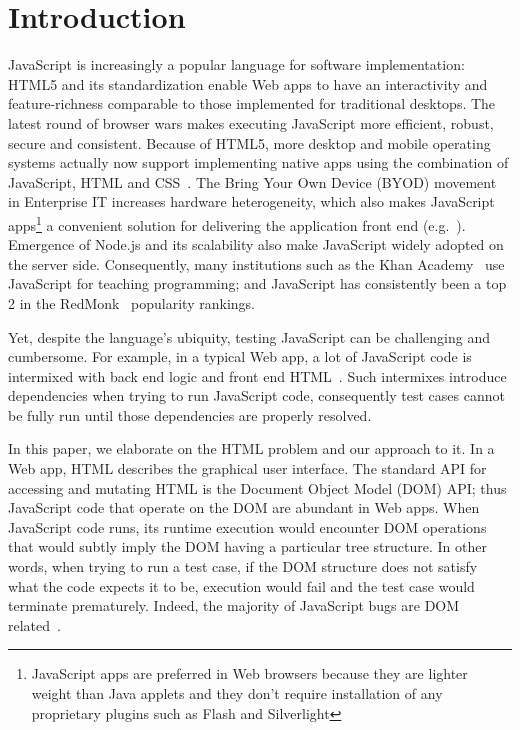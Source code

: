 \section{Introduction}
JavaScript is increasingly a popular language for software implementation: %
HTML5 and its standardization enable Web apps to have an interactivity and feature-richness comparable to those implemented for traditional desktops.  
The latest round of browser wars makes executing JavaScript more efficient, robust, secure and consistent.  
Because of HTML5, more desktop and mobile operating systems actually now support implementing native apps using the combination of JavaScript, HTML and CSS~\cite{jalangi}.
The Bring Your Own Device (BYOD) movement in Enterprise IT increases hardware heterogeneity, which also makes JavaScript apps\footnote{JavaScript apps are preferred in Web browsers because they are lighter weight than Java applets and they don't require installation of any proprietary plugins such as Flash and Silverlight} a convenient solution for delivering the application front end (e.g.~\cite{BNSFoffice365}).
Emergence of Node.js and its scalability also make JavaScript widely adopted on the server side.
Consequently, many institutions such as the Khan Academy~\cite{khanAcademy} use JavaScript for teaching programming; and JavaScript has consistently been a top 2 in the RedMonk~\cite{redmonk} popularity rankings.%

Yet, despite the language's ubiquity, testing JavaScript can be challenging and cumbersome.
For example, in a typical Web app, a lot of JavaScript code is intermixed with back end logic and front end HTML~\cite{QUnitIntro}.
Such intermixes introduce dependencies when trying to run JavaScript code, consequently test cases cannot be fully run until those dependencies are properly resolved.

In this paper, we elaborate on the HTML problem and our approach to it.
In a Web app, HTML describes the graphical user interface.  The standard API for accessing and mutating HTML is the Document Object Model (DOM) API; thus JavaScript code that operate on the DOM are abundant in Web apps.
When JavaScript code runs, its runtime execution would encounter DOM operations that would subtly imply the DOM having a particular tree structure. 
In other words, when trying to run a test case, if the DOM structure does not satisfy what the code expects it to be, execution would fail and the test case would terminate prematurely.
Indeed, the majority of JavaScript bugs are DOM related~\cite{frolin2013}.

